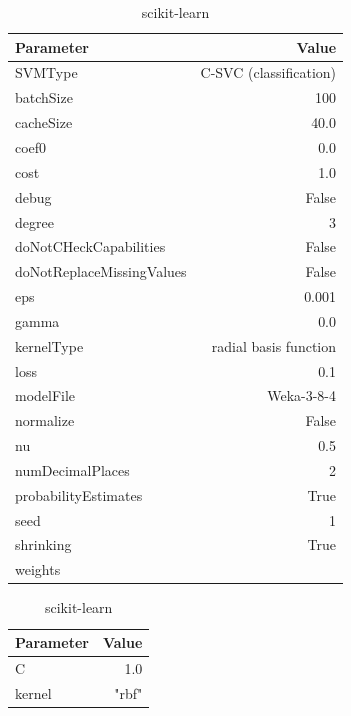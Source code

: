 \begin{table}[H]
    \footnotesize
    \centering
    \caption{SVM classifier used parameters in Weka and scikit-learn} \label{tab:svm_param}
    \begin{subtable}[t]{.5\linewidth}
        \caption{Weka \cite{noauthor_libsvm_nodate}}
        \centering
        \begin{tabular}{lr}\toprule
            Parameter & Value \\\midrule
            SVMType & C-SVC (classification) \\
            batchSize & 100 \\
            cacheSize & 40.0 \\
            coef0 & 0.0 \\
            cost & 1.0 \\
            debug & False \\
            degree & 3 \\
            doNotCHeckCapabilities & False \\
            doNotReplaceMissingValues & False \\
            eps & 0.001 \\
            gamma & 0.0 \\
            kernelType & radial basis function\\
            loss & 0.1 \\
            modelFile & Weka-3-8-4 \\
            normalize & False \\
            nu & 0.5 \\
            numDecimalPlaces & 2 \\
            probabilityEstimates & True \\
            seed & 1 \\
            shrinking & True \\
            weights & \\\bottomrule
        \end{tabular}
    \end{subtable}%
    \begin{subtable}[t]{.5\linewidth}
        \caption{scikit-learn \cite{noauthor_sklearnsvmsvc_nodate}}
        \centering
        \begin{tabular}{lr}\toprule
            Parameter & Value \\\midrule
            C & 1.0 \\
            kernel & "rbf" \\

\end{tabular}
\end{subtable}
\end{table}
